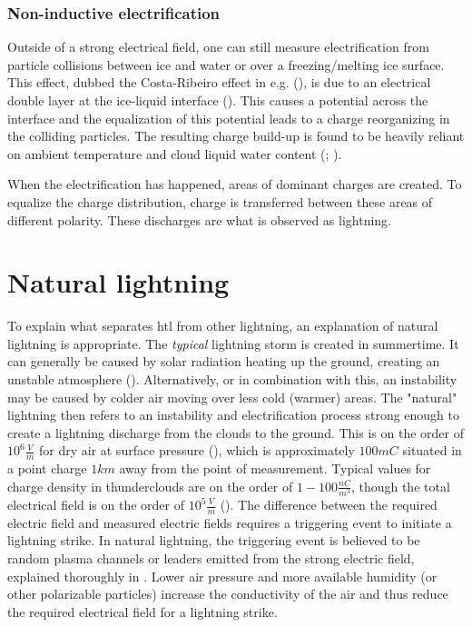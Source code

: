 \subsubsection{Non-inductive electrification}
Outside of a strong electrical field, one can still measure electrification from particle collisions between ice and water or over a freezing/melting ice surface. This effect, dubbed the Costa-Ribeiro effect in e.g. (\cite{pinatti1966}), is due to an electrical double layer at the ice-liquid interface (\cite{kallay2015}). This causes a potential across the interface and the equalization of this potential leads to a charge reorganizing in the colliding particles. The resulting charge build-up is found to be heavily reliant on ambient temperature and cloud liquid water content (\cite{saunders2005}; \cite{takahashi1999}). 

When the electrification has happened, areas of dominant charges are created. To equalize the charge distribution, charge is transferred between these areas of different polarity. These discharges are what is observed as lightning. 

\section{Natural lightning}

To explain what separates \acrlong{htl} from other lightning, an explanation of natural lightning is appropriate. The \textit{typical} lightning storm is created in summertime. It can generally be caused by solar radiation heating up the ground, creating an unstable atmosphere (\cite{rakovBok}). Alternatively, or in combination with this, an instability may be caused by colder air moving over less cold (warmer) areas. The "natural" lightning then refers to an instability and electrification process strong enough to create a lightning discharge from the clouds to the ground. This is on the order of $10^6 \frac{V}{m}$ for dry air at  surface pressure (\cite{rakovBok}), which is approximately $100mC$ situated in a point charge $1km$ away from the point of measurement. Typical values for charge density in thunderclouds are on the order of $1-100\frac{nC}{m^3}$, though the total electrical field is on the order of $10^{5} \frac{V}{m}$ (\cite{rakovBok}). The difference between the required electric field and measured electric fields requires a triggering event to initiate a lightning strike. In natural lightning, the triggering event is believed to be random plasma channels or leaders emitted from the strong electric field, explained thoroughly in \cite{rakovBok}. Lower air pressure and more available humidity (or other polarizable particles) increase the conductivity of the air and thus reduce the required electrical field for a lightning strike.

